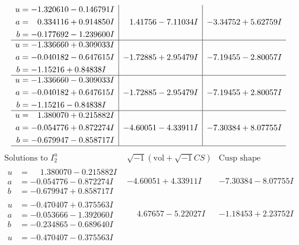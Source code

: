 \documentclass[1p]{elsarticle_modified}
\theoremstyle{definition}
\newcommand{\I}{\sqrt{-1}}
\begin{document}
$$\begin{array}{c|c|c}
\begin{aligned}
u &= -1.320610 - 0.146791 I \\
a &= \phantom{-}0.334116 + 0.914850 I \\
b &= -0.177692 - 1.239600 I\end{aligned}
 & \phantom{-}1.41756 - 7.11034 I & -3.34752 + 5.62759 I \\ \hline\begin{aligned}
u &= -1.336660 + 0.309033 I \\
a &= -0.040182 - 0.647615 I \\
b &= -1.15216 + 0.84838 I\end{aligned}
 & -1.72885 + 2.95479 I & -7.19455 - 2.80057 I \\ \hline\begin{aligned}
u &= -1.336660 - 0.309033 I \\
a &= -0.040182 + 0.647615 I \\
b &= -1.15216 - 0.84838 I\end{aligned}
 & -1.72885 - 2.95479 I & -7.19455 + 2.80057 I \\ \hline\begin{aligned}
u &= \phantom{-}1.380070 + 0.215882 I \\
a &= -0.054776 + 0.872274 I \\
b &= -0.679947 - 0.858717 I\end{aligned}
 & -4.60051 - 4.33911 I & -7.30384 + 8.07755 I\\
 \hline 
 \end{array}$$\newpage$$\begin{array}{c|c|c}  
\text{Solutions to }I^u_{2}& \I (\text{vol} + \sqrt{-1}CS) & \text{Cusp shape}\\
 \hline 
\begin{aligned}
u &= \phantom{-}1.380070 - 0.215882 I \\
a &= -0.054776 - 0.872274 I \\
b &= -0.679947 + 0.858717 I\end{aligned}
 & -4.60051 + 4.33911 I & -7.30384 - 8.07755 I \\ \hline\begin{aligned}
u &= -0.470407 + 0.375563 I \\
a &= -0.053666 - 1.392060 I \\
b &= -0.234865 - 0.689640 I\end{aligned}
 & \phantom{-}4.67657 - 5.22027 I & -1.18453 + 2.23752 I \\ \hline\begin{aligned}
u &= -0.470407 - 0.375563 I \\

\end{aligned}
\end{array}$$
\end{document}
